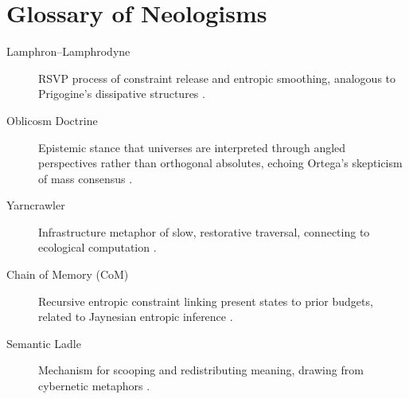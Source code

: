 \section{Glossary of Neologisms}
\begin{description}
    \item[Lamphron–Lamphrodyne] RSVP process of constraint release and entropic smoothing, analogous to Prigogine’s dissipative structures \cite{Prigogine1980}.
    \item[Oblicosm Doctrine] Epistemic stance that universes are interpreted through angled perspectives rather than orthogonal absolutes, echoing Ortega’s skepticism of mass consensus \cite{Ortega1930}.
    \item[Yarncrawler] Infrastructure metaphor of slow, restorative traversal, connecting to ecological computation \cite{Levin2022}.
    \item[Chain of Memory (CoM)] Recursive entropic constraint linking present states to prior budgets, related to Jaynesian entropic inference \cite{Jaynes2003}.
    \item[Semantic Ladle] Mechanism for scooping and redistributing meaning, drawing from cybernetic metaphors \cite{Wiener1948}.

\end{description}